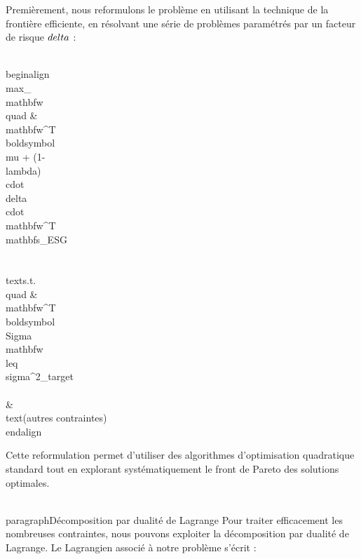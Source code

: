 Premièrement, nous reformulons le problème en utilisant la technique de la frontière efficiente, en résolvant une série de problèmes paramétrés par un facteur de risque $\\delta$ :

\\begin{align}
\\max_{\\mathbf{w}} \\quad & \\mathbf{w}^T \\boldsymbol{\\mu} + (1-\\lambda) \\cdot \\delta \\cdot \\mathbf{w}^T \\mathbf{s}_{ESG} \\\\
\\text{s.t.} \\quad & \\mathbf{w}^T \\boldsymbol{\\Sigma} \\mathbf{w} \\leq \\sigma^2_{target} \\\\
& \\text{(autres contraintes)}
\\end{align}

Cette reformulation permet d'utiliser des algorithmes d'optimisation quadratique standard tout en explorant systématiquement le front de Pareto des solutions optimales.

\\paragraph{Décomposition par dualité de Lagrange}
Pour traiter efficacement les nombreuses contraintes, nous pouvons exploiter la décomposition par dualité de Lagrange. Le Lagrangien associé à notre problème s'écrit :

